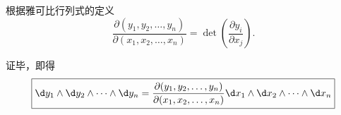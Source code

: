 \begin{myproof}
    根据雅可比行列式的定义
    \begin{equation}
        \frac{\partial(y_1, y_2, \dots, y_n)}{\partial(x_1, x_2, \dots, x_n)} = \det \left( \frac{\partial y_i}{\partial x_j} \right).
    \end{equation}

    证毕，即得
    \begin{equation}
        \boxed{\d y_1 \wedge \d y_2 \wedge \dots \wedge \d y_n = \frac{\partial(y_1, y_2, \dots, y_n)}{\partial(x_1, x_2, \dots, x_n)} \d x_1 \wedge \d x_2 \wedge \dots \wedge \d x_n}
    \end{equation}
\end{myproof}

\endinput
